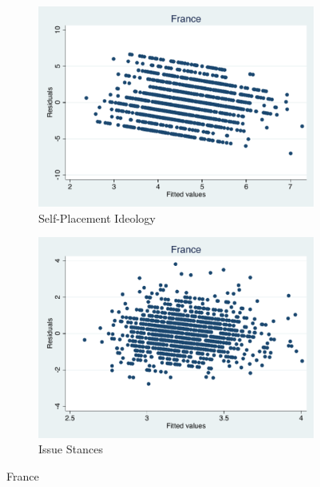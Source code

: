 \documentclass[12pt, titlepage]{article}
\begin{document}
\begin{figure}[H]
	\centering
	\begin{subfigure}[b]{0.475\textwidth}   
		\centering 
		\includegraphics[width=\textwidth]{Residuals/CountryIdeo/France}
		\caption{Self-Placement Ideology}
	\end{subfigure}
	\hfill
	\begin{subfigure}[b]{0.475\textwidth}
		\centering 
		\includegraphics[width=\textwidth]{Residuals/CountryLib/France}
		\caption{Issue Stances}
	\end{subfigure}
	\caption{France}
	\label{France}
\end{figure}
\end{document}
